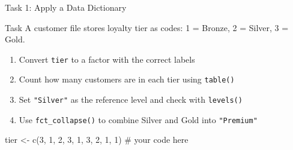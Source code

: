 \documentclass[
  ignorenonframetext,
  aspectratio=169,
]{beamer}
\newenvironment{Shaded}{\begin{snugshade}}{\end{snugshade}}
\newcommand{\CommentTok}[1]{\textcolor[rgb]{0.37,0.37,0.37}{#1}}
\newcommand{\DecValTok}[1]{\textcolor[rgb]{0.68,0.00,0.00}{#1}}
\newcommand{\FunctionTok}[1]{\textcolor[rgb]{0.28,0.35,0.67}{#1}}
\newcommand{\NormalTok}[1]{\textcolor[rgb]{0.00,0.23,0.31}{#1}}
\newcommand{\OtherTok}[1]{\textcolor[rgb]{0.00,0.23,0.31}{#1}}
\providecommand{\tightlist}{%
  \setlength{\itemsep}{0pt}\setlength{\parskip}{0pt}}\usepackage{longtable,booktabs,array}
\begin{document}
\begin{frame}[fragile]{Task 1: Apply a Data Dictionary}
\protect\hypertarget{task-1-apply-a-data-dictionary}{}
\begin{alertblock}{Task}
\protect\hypertarget{task}{}
A customer file stores loyalty tier as codes: 1 = Bronze, 2 = Silver, 3
= Gold.

\begin{enumerate}
\tightlist
\item
  Convert \texttt{tier} to a factor with the correct labels
\item
  Count how many customers are in each tier using \texttt{table()}
\item
  Set \texttt{"Silver"} as the reference level and check with
  \texttt{levels()}
\item
  Use \texttt{fct\_collapse()} to combine Silver and Gold into
  \texttt{"Premium"}
\end{enumerate}

\begin{Shaded}
\begin{Highlighting}[]
\NormalTok{tier }\OtherTok{\textless{}{-}} \FunctionTok{c}\NormalTok{(}\DecValTok{3}\NormalTok{, }\DecValTok{1}\NormalTok{, }\DecValTok{2}\NormalTok{, }\DecValTok{3}\NormalTok{, }\DecValTok{1}\NormalTok{, }\DecValTok{3}\NormalTok{, }\DecValTok{2}\NormalTok{, }\DecValTok{1}\NormalTok{, }\DecValTok{1}\NormalTok{)}
\CommentTok{\# your code here}
\end{Highlighting}
\end{Shaded}
\end{alertblock}
\end{frame}
\end{document}
